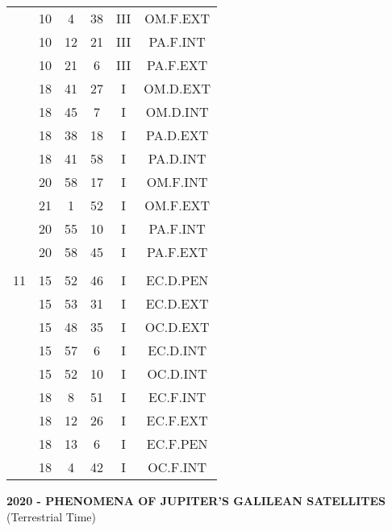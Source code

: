 \documentclass[12pt, a4paper]{article}
\begin{document}
\begin{multicols}{3}
{\begin{tabular}{c c c c c c}
	 	 	 	 & 10 & 4 & 38 & III & OM.F.EXT\\%
	 	 	 	 & 10 & 12 & 21 & III & PA.F.INT\\%
	 	 	 	 & 10 & 21 & 6 & III & PA.F.EXT\\%
	 	 	 	 & 18 & 41 & 27 & I & OM.D.EXT\\%
	 	 	 	 & 18 & 45 & 7 & I & OM.D.INT\\%
	 	 	 	 & 18 & 38 & 18 & I & PA.D.EXT\\%
	 	 	 	 & 18 & 41 & 58 & I & PA.D.INT\\%
	 	 	 	 & 20 & 58 & 17 & I & OM.F.INT\\%
	 	 	 	 & 21 & 1 & 52 & I & OM.F.EXT\\%
	 	 	 	 & 20 & 55 & 10 & I & PA.F.INT\\%
	 	 	 	 & 20 & 58 & 45 & I & PA.F.EXT\\%
	 	 	 	 & & & & & \\%
	 	 	 	11 & 15 & 52 & 46 & I & EC.D.PEN\\%
	 	 	 	 & 15 & 53 & 31 & I & EC.D.EXT\\%
	 	 	 	 & 15 & 48 & 35 & I & OC.D.EXT\\%
	 	 	 	 & 15 & 57 & 6 & I & EC.D.INT\\%
	 	 	 	 & 15 & 52 & 10 & I & OC.D.INT\\%
	 	 	 	 & 18 & 8 & 51 & I & EC.F.INT\\%
	 	 	 	 & 18 & 12 & 26 & I & EC.F.EXT\\%
	 	 	 	 & 18 & 13 & 6 & I & EC.F.PEN\\%
	 	 	 	 & 18 & 4 & 42 & I & OC.F.INT\\%
	 	 \end{tabular}
 	}
\end{multicols}
\pagebreak
\textbf{2020 - PHENOMENA OF JUPITER'S GALILEAN SATELLITES}\\(Terrestrial Time) 
\end{document}
